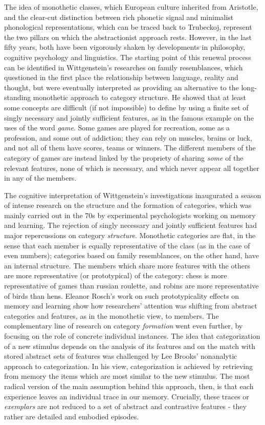 The idea of monothetic classes, which European culture inherited from Aristotle, and the clear-cut distinction between rich phonetic signal and minimalist phonological representations, which can be traced back to Trubeckoj, represent the two pillars on which the abstractionist approach rests. However, in the last fifty years, both have been vigorously shaken by developments in philosophy, cognitive psychology and linguistics. The starting point of this renewal process can be identified in Wittgenstein's researches on family resemblances, which questioned in the first place the relationship between language, reality and thought, but were eventually interpreted as providing an alternative to the long-standing monothetic approach to category structure. He showed that at least some concepts are difficult (if not impossible) to define by using a finite set of singly necessary and jointly sufficient features, as in the famous example on the uses of the word \textit{game}. Some games are played for recreation, some as a profession, and some out of addiction; they can rely on muscles, brains or luck, and not all of them have scores, teams or winners. The different members of the category of games are instead linked by the propriety of sharing \textit{some} of the relevant features, none of which is necessary, and which never appear all together in any of the members.

The cognitive interpretation of Wittgenstein's investigations inaugurated a season of intense research on the structure and the formation of categories, which was mainly carried out in the 70s by experimental psychologists working on memory and learning. The rejection of singly necessary and jointly sufficient features had major repercussions on category \textit{structure}. Monothetic categories are flat, in the sense that each member is equally representative of the class (as in the case of even numbers); categories based on family resemblances, on the other hand, have an internal structure. The members which share more features with the others are more representative (or prototypical) of the category: chess is more representative of games than russian roulette, and robins are more representative of birds than hens. Eleanor Rosch's work on such prototypicality effects on memory and learning show how researchers' attention was shifting from abstract categories and features, as in the monothetic view, to members. The complementary line of research on category \textit{formation} went even further, by focusing on the role of concrete individual instances. The idea that categorization of a new stimulus depends on the analysis of its features and on the match with stored abstract sets of features was challenged by Lee Brooks' nonanalytic approach to categorization. In his view, categorization is achieved by retrieving from memory the items which are most similar to the new stimulus. The most radical version of the main assumption behind this approach, then, is that each experience leaves an individual trace in our memory. Crucially, these traces or \textit{exemplars} are not reduced to a set of abstract and contrastive features - they rather are detailed and embodied episodes.

